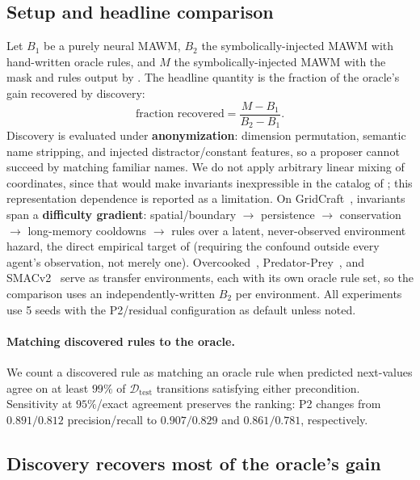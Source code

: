\documentclass[letterpaper]{article} %
\let\autoref\Cref
\theoremstyle{plain}
\theoremstyle{definition}
\theoremstyle{remark}
\begin{document}
\subsection{Setup and headline comparison}
\label{sec:exp-setup}
Let $B_1$ be a purely neural MAWM, $B_2$ the symbolically-injected MAWM with hand-written oracle rules, and $M$ the symbolically-injected MAWM with the mask and rules output by \autoref{alg:main}. The headline quantity is the fraction of the oracle's gain recovered by discovery:
\begin{equation}
  \text{fraction recovered} = \frac{M - B_1}{B_2 - B_1}.
\end{equation}
Discovery is evaluated under \textbf{anonymization}: dimension permutation, semantic name stripping, and injected distractor/constant features, so a proposer cannot succeed by matching familiar names. We do not apply arbitrary linear mixing of coordinates, since that would make invariants inexpressible in the catalog of \autoref{sec:catalog}; this representation dependence is reported as a limitation. On GridCraft~\cite{gridcraft2026anonymous}, invariants span a \textbf{difficulty gradient}: spatial/boundary $\to$ persistence $\to$ conservation $\to$ long-memory cooldowns $\to$ rules over a latent, never-observed environment hazard, the direct empirical target of \autoref{thm:t5} (requiring the confound outside every agent's observation, not merely one). Overcooked~\cite{Micah2020overcooked}, Predator-Prey~\cite{lowe2017multi}, and SMACv2~\cite{Ellis2023smacv2} serve as transfer environments, each with its own oracle rule set, so the comparison uses an independently-written $B_2$ per environment. All experiments use 5 seeds with the P2/residual configuration as default unless noted.

\paragraph{Matching discovered rules to the oracle.} We count a discovered rule as matching an oracle rule when predicted next-values agree on at least $99\%$ of $\mathcal{D}_{\mathrm{test}}$ transitions satisfying either precondition. Sensitivity at $95\%$/exact agreement preserves the ranking: P2 changes from $0.891/0.812$ precision/recall to $0.907/0.829$ and $0.861/0.781$, respectively.

\subsection{Discovery recovers most of the oracle's gain}
\label{sec:exp-recover}
\end{document}
